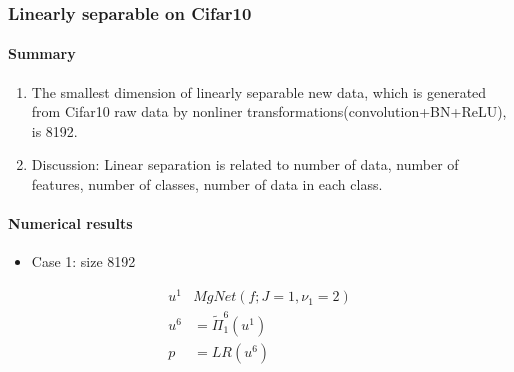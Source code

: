 \subsubsection{Linearly separable on Cifar10}
\paragraph{Summary}
\begin{enumerate}
\item The smallest dimension of linearly separable new data, which is generated from Cifar10 raw data by nonliner transformations(convolution+BN+ReLU), is 8192.
\item Discussion: Linear separation is related to number of data, number of features, number of classes, number of data in each class.
\end{enumerate}

\paragraph{Numerical results}

\begin{itemize}
	\item Case 1: size 8192
\end{itemize}



\begin{align}
u^1 & MgNet(f; J=1, \nu_1=2)  \\
u^{6} & = \tilde{\Pi}_1^6(u^1) \\
p & = LR(u^6)
\end{align}
\begin{table}[H]
	\caption{ResNet18 on CIFAR-10: $J=1,\nu_1=2,c_f^1=c_u^1=8$, with the last average pooling}
	\label{case1 with 1 grids_cifar10}
	\begin{threeparttable}
		
		\begin{center}
		\end{center}
		
	\end{threeparttable}
\end{table}

